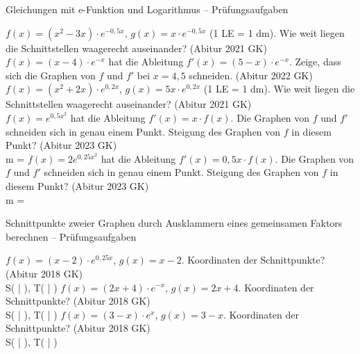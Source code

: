 \begin{aufgabe}{Gleichungen mit e-Funktion und Logarithmus – Prüfungsaufgaben}
\begin{teile}
\teil $f(x) = (x^2 - 3x) \cdot e^{-0{,}5x}$, $g(x) = x \cdot e^{-0{,}5x}$ (1 LE = 1 dm). Wie weit liegen die Schnittstellen waagerecht auseinander? \hfill (Abitur 2021 GK) \\ \leerfeld[dm]
\teil $f(x) = (x - 4) \cdot e^{-x}$ hat die Ableitung $f'(x) = (5 - x) \cdot e^{-x}$. Zeige, dass sich die Graphen von $f$ und $f'$ bei $x = 4{,}5$ schneiden. \hfill (Abitur 2022 GK)
\teil $f(x) = (x^2 + 2x) \cdot e^{0{,}2x}$, $g(x) = 5x \cdot e^{0{,}2x}$ (1 LE = 1 dm). Wie weit liegen die Schnittstellen waagerecht auseinander? \hfill (Abitur 2021 GK) \\ \leerfeld[dm]
\teil $f(x) = e^{0{,}5x^2}$ hat die Ableitung $f'(x) = x \cdot f(x)$. Die Graphen von $f$ und $f'$ schneiden sich in genau einem Punkt. Steigung des Graphen von $f$ in diesem Punkt? \hfill (Abitur 2023 GK) \\ m = \leerfeld
\teil $f(x) = 2e^{0{,}25x^2}$ hat die Ableitung $f'(x) = 0{,}5x \cdot f(x)$. Die Graphen von $f$ und $f'$ schneiden sich in genau einem Punkt. Steigung des Graphen von $f$ in diesem Punkt? \hfill (Abitur 2023 GK) \\ m = \leerfeld
\end{teile}
\end{aufgabe}

\begin{aufgabe}{Schnittpunkte zweier Graphen durch Ausklammern eines gemeinsamen Faktors berechnen – Prüfungsaufgaben}
\begin{teile}
\teil $f(x) = (x - 2) \cdot e^{0{,}25x}$, $g(x) = x - 2$. Koordinaten der Schnittpunkte? \hfill (Abitur 2018 GK) \\ S( \leerfeld | \leerfeld ), T( \leerfeld | \leerfeld )
\teil $f(x) = (2x + 4) \cdot e^{-x}$, $g(x) = 2x + 4$. Koordinaten der Schnittpunkte? \hfill (Abitur 2018 GK) \\ S( \leerfeld | \leerfeld ), T( \leerfeld | \leerfeld )
\teil $f(x) = (3 - x) \cdot e^{x}$, $g(x) = 3 - x$. Koordinaten der Schnittpunkte? \hfill (Abitur 2018 GK) \\ S( \leerfeld | \leerfeld ), T( \leerfeld | \leerfeld )
\end{teile}
\end{aufgabe}

